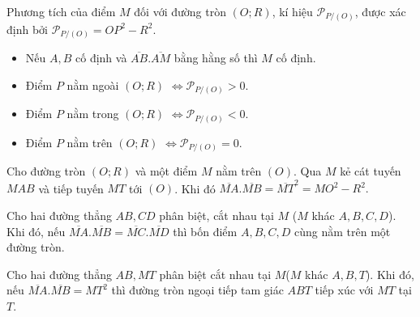 \begin{dn}
	Phương tích của điểm $M$ đối với đường tròn $(O;R)$, kí hiệu $\mathscr{P}_{P/(O)}$, được xác định bởi $\mathscr{P}_{P/(O)}=OP^2-R^2$.
\end{dn}

\begin{tc}\text{}
	\begin{itemize}
		\item Nếu $A, B$ cố định và $\overline{AB}.\overline{AM}$ bằng hằng số  thì $M$ cố định.
		\item 	Điểm $P$ nằm ngoài $(O; R)$ $\Leftrightarrow \mathscr{P}_{P/(O)}>0$.
		\item 	Điểm $P$ nằm trong $(O; R)$ $\Leftrightarrow \mathscr{P}_{P/(O)}<0$.
		\item 	Điểm $P$ nằm trên $(O; R)$ $\Leftrightarrow \mathscr{P}_{P/(O)}=0$.
	\end{itemize}
\end{tc}
\begin{tc}
	Cho đường tròn $(O; R)$ và một điểm $M$ nằm trên $(O)$. Qua $M$ kẻ cát tuyến $MAB$ và tiếp tuyến $MT$ tới $(O)$. Khi đó $\overline{MA}.\overline{MB}={\overline{MT}}^2=MO^2-R^2.$ 
\end{tc}

\begin{tc}
	Cho hai đường thẳng $AB,CD$ phân biệt, cắt nhau tại $M$ ($M$ khác $A,B,C,D$). Khi đó, nếu $\overline{MA}.\overline{MB}=\overline{MC}.\overline{MD}$ thì bốn điểm $A,B,C,D$ cùng nằm trên một đường tròn.
\end{tc}

\begin{tc}
	Cho hai đường thẳng $AB,MT$ phân biệt cắt nhau tại $M$($M$ khác $A,B,T$). Khi đó, nếu $\overline{MA}.\overline{MB}=MT^2$ thì đường tròn ngoại tiếp tam giác $ABT$ tiếp xúc với $MT$ tại $T$.
\end{tc}

